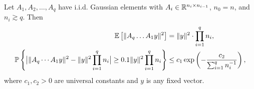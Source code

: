 \begin{lemma}
    \label{lemma:wide-gaussian-prod-tail}
    Let $A_1, A_2, \dots, A_{q}$ have i.i.d. Gaussian elements with $A_{i} \in \mathbb{R}^{n_{i} \times n_{i-1}}$, $n_{0} = n$,
	and $n_{i} \gtrsim q$. Then
    \begin{align}
    	\expec{\norm{A_{q} \dots A_1 y}^2} & = \norm{y}^2 \cdot \prod_{i=1}^q n_{i},
			\label{eq:expec-prod}  \\
        \prob{\abs[\big]{\norm{A_{q} \cdots A_1 y}^2 - \norm{y}^2 \prod_{i=1}^q n_i}
        \geq 0.1 \norm{y}^2 \prod_{i=1}^q n_i}
        &\leq c_1 \exp\left(-\frac{c_2}{\sum_{ i = 1 }^q n_i^{-1}} \right),
        \label{eq:tail-bound-prod}
    \end{align}
    where $c_1, c_2 > 0$ are universal constants and $y$ is any fixed vector.
\end{lemma}
